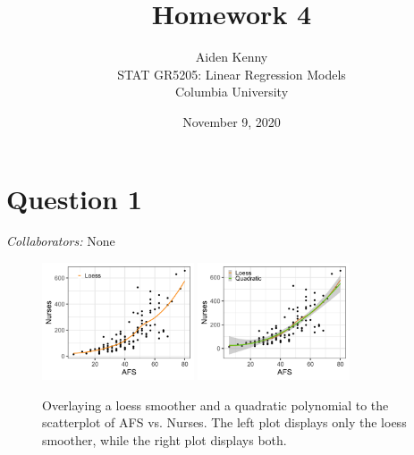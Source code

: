 \documentclass[10pt]{article}
\title{
    {\Large Homework 4}
}
\author{
    {\normalsize Aiden Kenny}\\
    {\normalsize STAT GR5205: Linear Regression Models}\\
    {\normalsize Columbia University}
}
\date{\normalsize November 9, 2020}
\newcommand{\mycolab}[1]{\textcolor{colabcol}{\textsl{Collaborators:}} #1 \\ }
\begin{document}
\maketitle

\section{Question 1} \noindent
\mycolab{None}
\begin{figure}[ht]
    \centering
    \includegraphics[width = 0.4\textwidth]{img/q01a-single.png}
    \quad
    \includegraphics[width = 0.4\textwidth]{img/q01a-both.png}
    \caption{Overlaying a loess smoother and a quadratic polynomial to the scatterplot of AFS vs. Nurses.
    The left plot displays only the loess smoother, while the right plot displays both.}
    \label{fig-q01a}
\end{figure}
\end{document}

